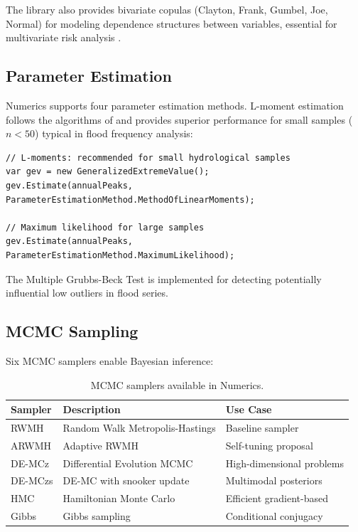 \documentclass[10pt,a4paper,onecolumn]{article}
\begin{document}
The library also provides bivariate copulas (Clayton, Frank, Gumbel, Joe, Normal) for modeling dependence structures between variables, essential for multivariate risk analysis \citep{nelsen2006, salvadori2007}.

\subsection*{Parameter Estimation}

Numerics supports four parameter estimation methods. L-moment estimation follows the algorithms of \citet{hosking1990} and provides superior performance for small samples ($n < 50$) typical in flood frequency analysis:

\begin{verbatim}
// L-moments: recommended for small hydrological samples
var gev = new GeneralizedExtremeValue();
gev.Estimate(annualPeaks, ParameterEstimationMethod.MethodOfLinearMoments);

// Maximum likelihood for large samples
gev.Estimate(annualPeaks, ParameterEstimationMethod.MaximumLikelihood);
\end{verbatim}

The Multiple Grubbs-Beck Test \citep{cohn2013} is implemented for detecting potentially influential low outliers in flood series.

\subsection*{MCMC Sampling}

Six MCMC samplers enable Bayesian inference:

\begin{table}[h]
\centering
\begin{tabular}{lll}
\hline
\textbf{Sampler} & \textbf{Description} & \textbf{Use Case} \\
\hline
RWMH & Random Walk Metropolis-Hastings & Baseline sampler \\
ARWMH & Adaptive RWMH \citep{haario2001} & Self-tuning proposal \\
DE-MCz & Differential Evolution MCMC \citep{terbraak2008} & High-dimensional problems \\
DE-MCzs & DE-MC with snooker update & Multimodal posteriors \\
HMC & Hamiltonian Monte Carlo \citep{neal2011} & Efficient gradient-based \\
Gibbs & Gibbs sampling & Conditional conjugacy \\
\hline
\end{tabular}
\caption{MCMC samplers available in Numerics.}
\end{table}
\end{document}
